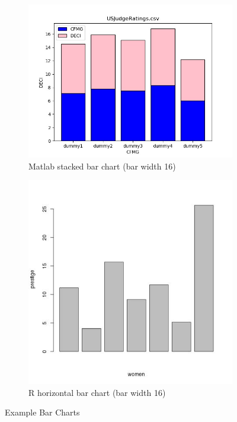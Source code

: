 \documentclass[12pt, a4paper,oneside]{report}
\begin{document}
\begin{figure}[!htbp]
	\begin{subfigure}{.5\textwidth}
		\centering
		\includegraphics[width=.8\linewidth]{bar1}
		\caption{Matlab stacked bar chart (bar width 16) }
		\label{fig:sfig1}
	\end{subfigure}%
	\begin{subfigure}{.5\textwidth}
		\centering
		\includegraphics[width=.8\linewidth]{bar2}
		\caption{R horizontal bar chart (bar width 16)}
		\label{fig:sfig2}
	\end{subfigure}
	\caption{Example Bar Charts}
	\label{fig:fig}
\end{figure}
\end{document}
